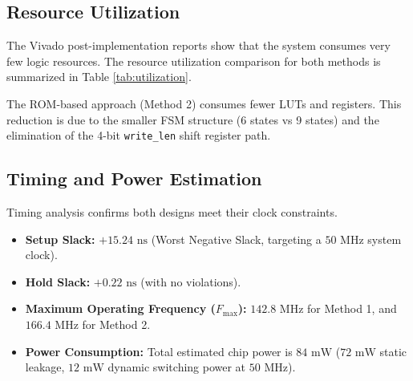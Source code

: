 \documentclass[conference]{IEEEtran}
\begin{document}
\subsection{Resource Utilization}
The Vivado post-implementation reports show that the system consumes very few logic resources. The resource utilization comparison for both methods is summarized in Table \ref{tab:utilization}.

\begin{table}[htbp]
\caption{Post-Implementation Resource Utilization}
\label{tab:utilization}
\centering
{}
\end{table}

The ROM-based approach (Method 2) consumes fewer LUTs and registers. This reduction is due to the smaller FSM structure (6 states vs 9 states) and the elimination of the 4-bit \texttt{write\_len} shift register path.

\subsection{Timing and Power Estimation}
Timing analysis confirms both designs meet their clock constraints.
\begin{itemize}
    \item \textbf{Setup Slack:} $+15.24\text{ ns}$ (Worst Negative Slack, targeting a $50\text{ MHz}$ system clock).
    \item \textbf{Hold Slack:} $+0.22\text{ ns}$ (with no violations).
    \item \textbf{Maximum Operating Frequency ($F_{\text{max}}$):} $142.8\text{ MHz}$ for Method 1, and $166.4\text{ MHz}$ for Method 2.
    \item \textbf{Power Consumption:} Total estimated chip power is $84\text{ mW}$ ($72\text{ mW}$ static leakage, $12\text{ mW}$ dynamic switching power at $50\text{ MHz}$).
\end{itemize}
\end{document}
